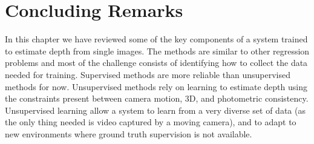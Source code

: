 




\section{Concluding Remarks}

In this chapter we have reviewed some of the key components of a system trained to estimate depth from single images. The methods are similar to other regression problems and most of the challenge consists of identifying how to collect the data needed for training. Supervised methods are more reliable than unsupervised methods for now. Unsupervised methods  rely on learning to estimate depth using the constraints present between camera motion, 3D, and photometric consistency. Unsupervised learning allow a system to learn from a very diverse set of data (as the only thing needed is video captured by a moving camera), and to adapt to new environments where ground truth supervision is not available.
